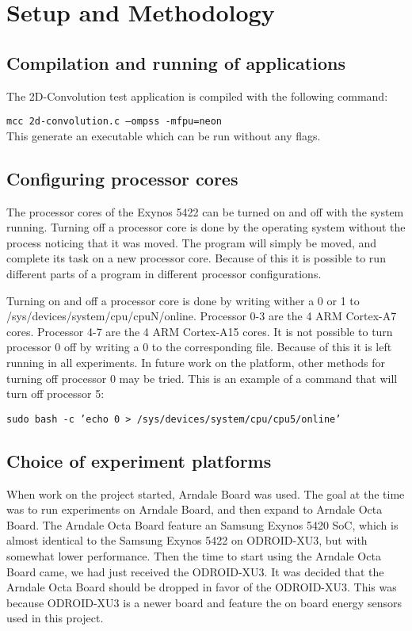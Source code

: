 \chapter[Setup and Methodology]{Setup and Methodology} \label{setupandmethodology}

\section{Compilation and running of applications}
The 2D-Convolution test application is compiled with the following command:

\texttt{mcc 2d-convolution.c --ompss -mfpu=neon}\\
This generate an executable which can be run without any flags.

\section{Configuring processor cores}
The processor cores of the Exynos 5422 can be turned on and off with the system running.
Turning off a processor core is done by the operating system without the process noticing that it was moved.
The program will simply be moved, and complete its task on a new processor core.
Because of this it is possible to run different parts of a program in different processor configurations.

Turning on and off a processor core is done by writing wither a 0 or 1 to /sys/devices/system/cpu/cpuN/online.
Processor 0-3 are the 4 ARM Cortex-A7 cores.
Processor 4-7 are the 4 ARM Cortex-A15 cores.
It is not possible to turn processor 0 off by writing a 0 to the corresponding file.
Because of this it is left running in all experiments.
In future work on the platform, other methods for turning off processor 0 may be tried.
This is an example of a command that will turn off processor 5:

\texttt{sudo bash -c 'echo 0 > /sys/devices/system/cpu/cpu5/online'}

\section{Choice of experiment platforms}
When work on the project started, Arndale Board was used.
The goal at the time was to run experiments on Arndale Board, and then expand to Arndale Octa Board.
The Arndale Octa Board feature an Samsung Exynos 5420 SoC, which is almost identical to the Samsung Exynos 5422 on ODROID-XU3, but with somewhat lower performance.
Then the time to start using the Arndale Octa Board came, we had just received the ODROID-XU3.
It was decided that the Arndale Octa Board should be dropped in favor of the ODROID-XU3.
This was because ODROID-XU3 is a newer board and feature the on board energy sensors used in this project.

